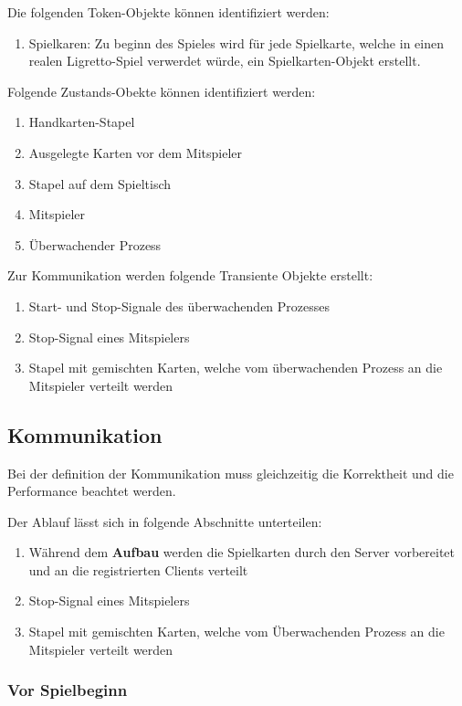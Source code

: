 Die folgenden Token-Objekte können identifiziert werden:
\begin{enumerate}
	\item Spielkaren: Zu beginn des Spieles wird für jede Spielkarte, welche in einen realen Ligretto-Spiel verwerdet würde, ein Spielkarten-Objekt erstellt.
\end{enumerate}

Folgende Zustands-Obekte können identifiziert werden:
\begin{enumerate}
	\item Handkarten-Stapel
	\item Ausgelegte Karten vor dem Mitspieler
	\item Stapel auf dem Spieltisch
	\item Mitspieler
	\item Überwachender Prozess
\end{enumerate}

Zur Kommunikation werden folgende Transiente Objekte erstellt:
\begin{enumerate}
	\item Start- und Stop-Signale des überwachenden Prozesses
	\item Stop-Signal eines Mitspielers
	\item Stapel mit gemischten Karten, welche vom überwachenden Prozess an die Mitspieler verteilt werden
\end{enumerate}

\subsection{Kommunikation}

Bei der definition der Kommunikation muss gleichzeitig die Korrektheit und die Performance beachtet werden.

Der Ablauf lässt sich in folgende Abschnitte unterteilen:
\begin{enumerate}
	\item Während dem {\bf Aufbau} werden die Spielkarten durch den Server vorbereitet und an die registrierten Clients verteilt
	\item Stop-Signal eines Mitspielers
	\item Stapel mit gemischten Karten, welche vom Überwachenden Prozess an die Mitspieler verteilt werden
\end{enumerate}



\subsubsection{Vor Spielbeginn}

